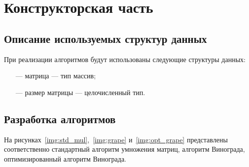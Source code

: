 \chapter{Конструкторская часть}

\section{Описание используемых структур данных}

При реализации алгоритмов будут использованы следующие структуры данных:

\begin{itemize}
	\item[---] матрица --- тип массив;
	\item[---] размер матрицы --- целочисленный тип.
\end{itemize}

\section{Разработка алгоритмов}

На рисунках~\ref{img:std_mul},~\ref{img:grape} и~\ref{img:opt_grape} представлены соответственно стандартный алгоритм умножения матриц, алгоритм Винограда, оптимизированный алгоритм Винограда.


